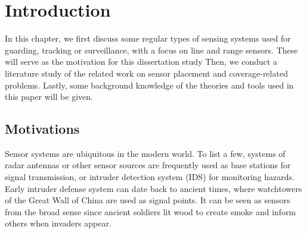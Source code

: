 
\chapter{Introduction} 
\thispagestyle{myheadings} 
In this chapter, we first discuss some regular types of sensing systems 
used for guarding, tracking or surveillance, 
with a focus on line and range sensors. 
These will serve as the motivation for this dissertation study
Then, we conduct a literature study of the related work on sensor placement and 
coverage-related problems. 
Lastly, some background knowledge of the theories and tools used in this paper will be given. 

\section{Motivations} 
Sensor systems are ubiquitous in the modern world. 
To list a few, systems of radar antennas 
or other sensor sources are frequently used as base stations for signal transmission, 
or intruder detection system (IDS) for monitoring hazards. 
Early intruder defense system can date back to ancient times, where 
watchtowers of the Great Wall of China are used as signal points. 
It can be seen as sensors from the broad sense 
since ancient soldiers lit wood to create smoke and inform others when invaders appear. 
